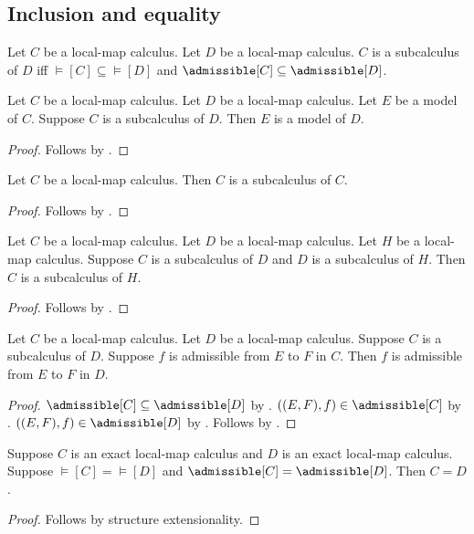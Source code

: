 \subsection{Inclusion and equality}

\begin{definition}\label{subcalculus}
    Let $C$ be a local-map calculus.
    Let $D$ be a local-map calculus.
    $C$ is a subcalculus of $D$ iff
        $\models[C]\subseteq\models[D]$ and
        $\admissible[C]\subseteq\admissible[D]$.
\end{definition}

\begin{classification}\label{subcalculus_model}
    Let $C$ be a local-map calculus.
    Let $D$ be a local-map calculus.
    Let $E$ be a model of $C$.
    Suppose $C$ is a subcalculus of $D$.
    Then $E$ is a model of $D$.
\end{classification}
\begin{proof}
    Follows by .
\end{proof}

\begin{theorem}\label{subcalculus_reflexive}
    Let $C$ be a local-map calculus.
    Then $C$ is a subcalculus of $C$.
\end{theorem}
\begin{proof}
    Follows by .
\end{proof}

\begin{theorem}\label{subcalculus_transitive}
    Let $C$ be a local-map calculus.
    Let $D$ be a local-map calculus.
    Let $H$ be a local-map calculus.
    Suppose $C$ is a subcalculus of $D$ and $D$ is a subcalculus of $H$.
    Then $C$ is a subcalculus of $H$.
\end{theorem}
\begin{proof}
    Follows by .
\end{proof}

\begin{theorem}\label{subcalculus_admissibility}
    Let $C$ be a local-map calculus.
    Let $D$ be a local-map calculus.
    Suppose $C$ is a subcalculus of $D$.
    Suppose $f$ is admissible from $E$ to $F$ in $C$.
    Then $f$ is admissible from $E$ to $F$ in $D$.
\end{theorem}
\begin{proof}
    $\admissible[C]\subseteq\admissible[D]$ by .
    $((E,F),f)\in\admissible[C]$ by .
    $((E,F),f)\in\admissible[D]$ by .
    Follows by .
\end{proof}

\begin{theorem}\label{exact_local_map_calculus_extensionality}
    Suppose $C$ is an exact local-map calculus and $D$ is an exact local-map calculus.
    Suppose $\models[C]=\models[D]$ and $\admissible[C]=\admissible[D]$.
    Then $C=D$.
\end{theorem}
\begin{proof}
    Follows by structure extensionality.
\end{proof}
